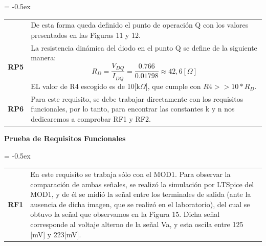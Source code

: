 \centering
\extrarowheight = -0.5ex
\renewcommand{\arraystretch}{2.25}
\begin{tabular}{p{} p{}}
& De esta forma queda definido el punto de operación Q con los valores presentados en las Figuras 11 y 12. 
\\ 

\textbf{RP5} & La resistencia dinámica del diodo en el punto Q se define de la siguiente manera:
\[ R_{D} = \frac{V_{DQ}}{I_{DQ}} = \frac{0.766}{0.01798} \approx 42,6 [\Omega]
\]
EL valor de R4 escogido es de 10[k$\Omega$], que cumple con $R4 >> 10 * R_{D}$.
\\

\textbf{RP6} & Para este requisito, se debe trabajar directamente con los requisitos funcionales, por lo tanto, para encontrar las constantes k y n nos dedicaremos a comprobar RF1 y RF2.
\end{tabular}

\newpage
\RaggedRight
\textbf{Prueba de Requisitos Funcionales} 
\\
\vspace{0.7cm}

\centering
\extrarowheight = -0.5ex
\renewcommand{\arraystretch}{2.25}
\begin{tabular}{p{} p{}}

\textbf{RF1} & En este requisito se trabaja sólo con el MOD1. Para observar la comparación de ambas señales, se realizó la simulación por LTSpice del MOD1, y de él se midió la señal entre los terminales de salida (ante la ausencia de dicha imagen, que se realizó en el laboratorio), del cual se obtuvo la señal que observamos en la Figura 15. Dicha señal corresponde al voltaje alterno de la señal Va, y esta oscila entre 125 [mV] y 223[mV]. 
\\
\end{tabular}

